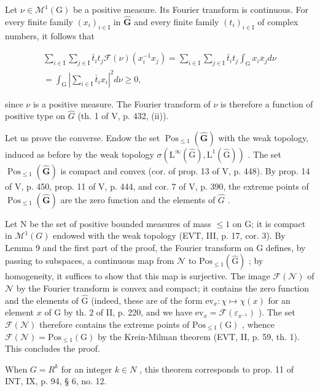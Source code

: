 Let \(\nu \in \mathcal{M}^{1}(\mathrm{G})\) be a positive measure. Its Fourier transform is continuous. For every finite family \((x_{i})_{i\in \mathrm{I}}\) in \(\widehat{\mathbf{G}}\) and every finite family \((t_i)_{i\in \mathrm{I}}\) of complex numbers, it follows that

\[
\begin{array}{r} \sum_ {i \in \mathrm{I}} \sum_ {j \in \mathrm{I}} \bar {t} _ {i} t _ {j} \mathcal {F} (\nu) (x _ {i} ^ {- 1} x _ {j}) = \sum_ {i \in \mathrm{I}} \sum_ {j \in \mathrm{I}} \bar {t} _ {i} t _ {j} \int_ {\mathrm{G}} x _ {i} \overline {{x}} _ {j} d \nu \\ = \int_ {\mathrm{G}} \left| \sum_ {i \in \mathrm{I}} \bar {t} _ {i} x _ {i} \right| ^ {2} d \nu \geqslant 0, \end{array}
\]

since \(\nu\) is a positive measure. The Fourier transform of \(\nu\) is therefore a function of positive type on \(\hat{G}\) (th. 1 of V, p. 432, (ii)).

Let us prove the converse. Endow the set \(\operatorname{Pos}_{\leqslant1}(\widehat{\mathbf{G}})\) with the weak topology, induced as before by the weak topology \(\sigma(\mathrm{L}^{\infty}(\widehat{\mathrm{G}}),\mathrm{L}^{1}(\widehat{\mathrm{G}}))\) . The set \(\operatorname{Pos}_{\leqslant1}(\widehat{\mathbf{G}})\) is compact and convex (cor. of prop. 13 of V, p. 448). By prop. 14 of V, p. 450, prop. 11 of V, p. 444, and cor. 7 of V, p. 390, the extreme points of \(\operatorname{Pos}_{\leqslant1}(\widehat{\mathbf{G}})\) are the zero function and the elements of \(\widehat{G}\) .

Let N be the set of positive bounded measures of mass \(\leqslant 1\) on G; it is compact in \(\mathcal{M}^{1}(G)\) endowed with the weak topology (EVT, III, p. 17, cor. 3). By Lemma 9 and the first part of the proof, the Fourier transform on G defines, by passing to subspaces, a continuous map from \(\mathcal{N}\) to \(\mathrm{Pos}_{\leqslant 1}(\widehat{\mathrm{G}})\) ; by homogeneity, it suffices to show that this map is surjective. The image \(\mathcal{F}(\mathcal{N})\) of \(\mathcal{N}\) by the Fourier transform is convex and compact; it contains the zero function and the elements of \(\widehat{\mathrm{G}}\) (indeed, these are of the form \(\mathrm{ev}_x\colon \chi \mapsto \chi (x)\) for an element \(x\) of G by th. 2 of II, p. 220, and we have \(\mathrm{ev}_x = \mathcal{F}(\varepsilon_{x^{-1}})\) ). The set \(\mathcal{F}(\mathcal{N})\) therefore contains the extreme points of \(\mathrm{Pos}_{\leqslant 1}(\mathrm{G})\) , whence \(\mathcal{F}(\mathcal{N}) = \mathrm{Pos}_{\leqslant 1}(\mathrm{G})\) by the Krein-Milman theorem (EVT, II, p. 59, th. 1). This concludes the proof.

When \(G = R^{k}\) for an integer \(k \in N\) , this theorem corresponds to prop. 11 of INT, IX, p. 94, § 6, no. 12.

